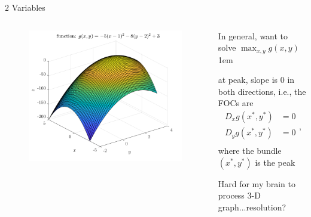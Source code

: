 \documentclass[11pt,aspectratio=43]{beamer}
\let\olditemize=\itemize
\let\endolditemize=\enditemize
\renewenvironment{itemize}{\olditemize \itemsep1em}{\endolditemize}
\theoremstyle{definition}
\begin{document}
\begin{frame}{$2$ Variables}
\label{slide:_2__Variables}
    \begin{columns}
        \begin{column}{0.6\textwidth}
            \begin{figure}
                \includegraphics[width=\textwidth]{./figures/2Var.png}
            \end{figure}
        \end{column}
        \begin{column}{0.4\textwidth}
            In general, want to solve $\max_{x, y} g( x, y )$
            \begin{itemize}
                \item at peak, slope is $ 0 $ \alert{in both directions}, i.e., the FOC\alert{s} are
                \begin{equation*}
                    \begin{split}
                        D_{x}g( x^{*}, y^{*} )
                            & = 0
                        \\
                        D_{y}g( x^{*}, y^{*} )
                            & = 0
                        \\
                    \end{split}
                ,\end{equation*}
                where the bundle $ (x^{*}, y^{*}) $ is the peak
                \item Hard for my brain to process 3-D graph...\alert{resolution}?
            \end{itemize}
        \end{column}
    \end{columns}

\end{frame}
\end{document}
